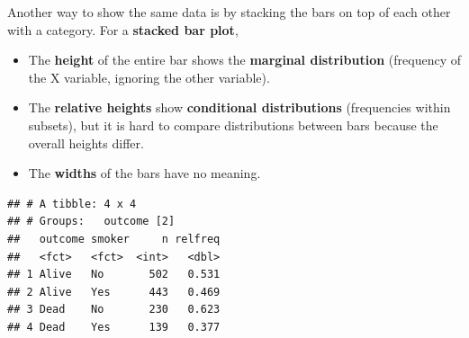 \documentclass[
]{book}
\newenvironment{Shaded}{\begin{snugshade}}{\end{snugshade}}
\newcommand{\CommentTok}[1]{\textcolor[rgb]{0.56,0.35,0.01}{\textit{#1}}}
\newcommand{\DataTypeTok}[1]{\textcolor[rgb]{0.13,0.29,0.53}{#1}}
\newcommand{\KeywordTok}[1]{\textcolor[rgb]{0.13,0.29,0.53}{\textbf{#1}}}
\newcommand{\NormalTok}[1]{#1}
\newcommand{\OperatorTok}[1]{\textcolor[rgb]{0.81,0.36,0.00}{\textbf{#1}}}
\newcommand{\StringTok}[1]{\textcolor[rgb]{0.31,0.60,0.02}{#1}}
\providecommand{\tightlist}{%
  \setlength{\itemsep}{0pt}\setlength{\parskip}{0pt}}
\begin{document}
Another way to show the same data is by stacking the bars on top of each other with a category. For a \textbf{stacked bar plot},

\begin{itemize}
\tightlist
\item
  The \textbf{height} of the entire bar shows the \textbf{marginal distribution} (frequency of the X variable, ignoring the other variable).
\item
  The \textbf{relative heights} show \textbf{conditional distributions} (frequencies within subsets), but it is hard to compare distributions between bars because the overall heights differ.
\item
  The \textbf{widths} of the bars have no meaning.
\end{itemize}

\begin{Shaded}
\end{Shaded}

\begin{verbatim}
## # A tibble: 4 x 4
## # Groups:   outcome [2]
##   outcome smoker     n relfreq
##   <fct>   <fct>  <int>   <dbl>
## 1 Alive   No       502   0.531
## 2 Alive   Yes      443   0.469
## 3 Dead    No       230   0.623
## 4 Dead    Yes      139   0.377
\end{verbatim}

\begin{Shaded}
\end{Shaded}
\end{document}
